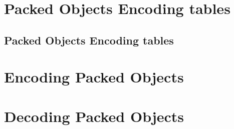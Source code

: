 \section{Packed Objects Encoding tables}

\subsection{Packed Objects Encoding tables} 

\section{Encoding Packed Objects}

\section{Decoding Packed Objects}
